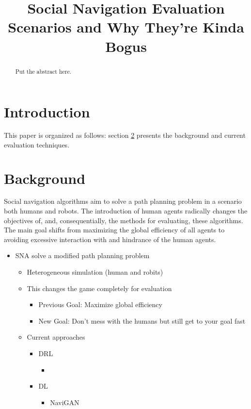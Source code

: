 \documentclass[conference,letter,10pt,final]{IEEEtran}
\date{}
\title{Social Navigation Evaluation Scenarios and Why They're Kinda Bogus}
\begin{document}
\makeatletter
\let\orgtitle\@title
\makeatother

\title{\orgtitle}

\author{


}

\maketitle

\begin{abstract}

Put the abstract here.

\end{abstract}

\section{Introduction}
\label{sec:org8b7aafd}

This paper is organized as follows: section \ref{sec.background} presents the background and current evaluation techniques.

\section{Background}
\label{sec.background}
Social navigation algorithms aim to solve a path planning problem in a scenario
both humans and robots. The introduction of human agents radically changes the
objectives of, and, consequentially, the methods for evaluating, these algorithms.
The main goal shifts from maximizing the global efficiency of all agents to
avoiding excessive interaction with and hindrance of the human agents.

\begin{itemize}
\item SNA solve a modified path planning problem
\begin{itemize}
\item Heterogeneous simulation (human and robits)
\item This changes the game completely for evaluation
\begin{itemize}
\item Previous Goal: Maximize global efficiency
\item New Goal: Don't mess with the humans but still get to your goal fast
\end{itemize}
\item Current approaches
\begin{itemize}
\item DRL
\begin{itemize}
\item \cite{chen2017socially}
\end{itemize}
\item DL
\begin{itemize}
\item NaviGAN
\end{itemize}
\end{itemize}
\end{itemize}
\end{itemize}
\end{document}
